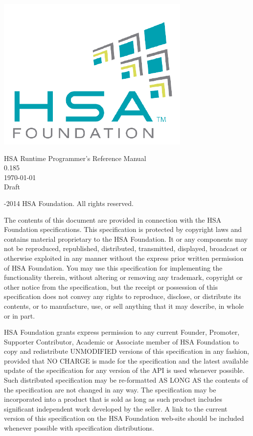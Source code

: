 \documentclass[final]{book}
\newcommand{\doctitle}{HSA Runtime Programmer's Reference Manual}
\newcommand{\docversion}{0.185}
\begin{document}
\hypersetup{pageanchor=false,citecolor=black}
\begin{titlepage}
\includegraphics[width=.5\textwidth]{fig/foundation.png}
\vspace*{7cm}
\begin{center}
{\Large \doctitle\\[1ex]\large\docversion}\\
\vspace*{1cm}
\vspace*{0.5cm}
{\small \today}\\
\vspace*{0.5cm}
{\small Draft}\\
\end{center}
\end{titlepage}
\thispagestyle{empty} {-2014 HSA Foundation. All rights
  reserved.}


The contents of this document are provided in connection with the HSA Foundation
specifications. This specification is protected by copyright laws and contains
material proprietary to the HSA Foundation. It or any components may not be
reproduced, republished, distributed, transmitted, displayed, broadcast or
otherwise exploited in any manner without the express prior written permission
of HSA Foundation. You may use this specification for implementing the
functionality therein, without altering or removing any trademark, copyright or
other notice from the specification, but the receipt or possession of this
specification does not convey any rights to reproduce, disclose, or distribute
its contents, or to manufacture, use, or sell anything that it may describe, in
whole or in part.

HSA Foundation grants express permission to any current Founder, Promoter,
Supporter Contributor, Academic or Associate member of HSA Foundation to copy
and redistribute UNMODIFIED versions of this specification in any fashion,
provided that NO CHARGE is made for the specification and the latest available
update of the specification for any version of the API is used whenever
possible. Such distributed specification may be re-formatted AS LONG AS the
contents of the specification are not changed in any way. The specification may
be incorporated into a product that is sold as long as such product includes
significant independent work developed by the seller. A link to the current
version of this specification on the HSA Foundation web-site should be included
whenever possible with specification distributions.
\end{document}

